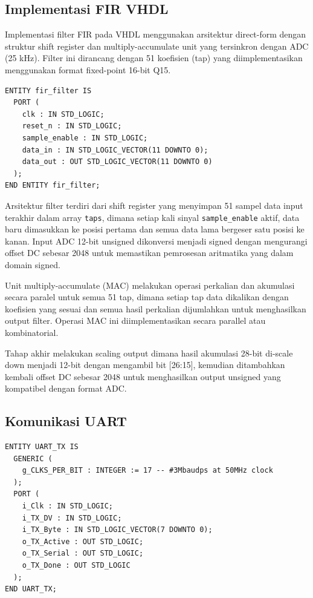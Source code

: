 \documentclass{article}
\begin{document}
\subsection{Implementasi FIR VHDL}
Implementasi filter FIR pada VHDL menggunakan arsitektur direct-form dengan struktur shift register dan multiply-accumulate unit yang tersinkron dengan ADC (25 kHz).
Filter ini dirancang dengan 51 koefisien (tap) yang diimplementasikan menggunakan format fixed-point 16-bit Q15.

\begin{lstlisting}[style=vhdl, caption={Entity FIR Filter}]
ENTITY fir_filter IS
  PORT (
    clk : IN STD_LOGIC;
    reset_n : IN STD_LOGIC;
    sample_enable : IN STD_LOGIC;
    data_in : IN STD_LOGIC_VECTOR(11 DOWNTO 0);
    data_out : OUT STD_LOGIC_VECTOR(11 DOWNTO 0)
  );
END ENTITY fir_filter;
\end{lstlisting}

Arsitektur filter terdiri dari shift register yang menyimpan 51 sampel data input terakhir dalam array \texttt{taps},
dimana setiap kali sinyal \texttt{sample\_enable} aktif, data baru dimasukkan ke posisi pertama dan semua data lama
bergeser satu posisi ke kanan. Input ADC 12-bit unsigned dikonversi menjadi signed dengan mengurangi offset DC
sebesar 2048 untuk memastikan pemrosesan aritmatika yang dalam domain signed.

Unit multiply-accumulate (MAC) melakukan operasi perkalian dan akumulasi secara paralel untuk semua 51 tap,
dimana setiap tap data dikalikan dengan koefisien yang sesuai dan semua hasil perkalian dijumlahkan untuk
menghasilkan output filter.
Operasi MAC ini diimplementasikan secara parallel atau kombinatorial.

Tahap akhir melakukan scaling output dimana hasil
akumulasi 28-bit di-scale down menjadi 12-bit dengan mengambil bit [26:15],
kemudian ditambahkan kembali offset DC sebesar 2048 untuk menghasilkan output unsigned yang kompatibel dengan format ADC.

\subsection{Komunikasi UART}

\begin{lstlisting}[style=vhdl, caption={Entity UART Transmitter}]
ENTITY UART_TX IS
  GENERIC (
    g_CLKS_PER_BIT : INTEGER := 17 -- #3Mbaudps at 50MHz clock
  );
  PORT (
    i_Clk : IN STD_LOGIC;
    i_TX_DV : IN STD_LOGIC;
    i_TX_Byte : IN STD_LOGIC_VECTOR(7 DOWNTO 0);
    o_TX_Active : OUT STD_LOGIC;
    o_TX_Serial : OUT STD_LOGIC;
    o_TX_Done : OUT STD_LOGIC
  );
END UART_TX;
\end{lstlisting}
\end{document}
